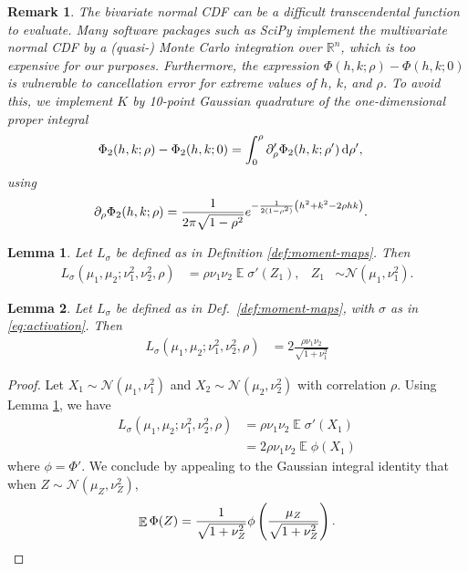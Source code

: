 \documentclass[oneside, article]{memoir}
\newtheorem{remark}{Remark}
\newtheorem{lemma}{Lemma}
\DeclareMathOperator{\expect}{\mathbb{E}}
\begin{document}
\begin{remark}
  The bivariate normal CDF can be a difficult transcendental function
  to evaluate.
  Many software packages such as SciPy \cite{wagner_kalman_2022}
  implement the multivariate normal CDF by a (quasi-) Monte Carlo
  integration over \(\mathbb{R}^n\), which is too expensive for our purposes.
  Furthermore, the expression \(\Phi(h, k; \rho) - \Phi(h, k; 0)\) is
  vulnerable to cancellation error for extreme values of \(h\),
  \(k\), and \(\rho\).
  To avoid this, we implement \(K\) by 10-point Gaussian quadrature
  of the one-dimensional proper integral \cite{drezner_computation_1990}
  \begin{align*}
    \Phi_2(h, k; \rho) -
    \Phi_2(h, k; 0)
    &= \int_0^\rho \partial_\rho' \Phi_2(h, k; \rho') \dif\rho',
  \end{align*}
  using
  \begin{align*}
    \partial_\rho \Phi_2(h, k; \rho)
    &= \frac{1}{2\pi \sqrt{1 - \rho^2}} e^{-\frac{1}{2(1 - \rho^2)}
    \del{h^2 + k^2 - 2 \rho h k}}.
  \end{align*}
\end{remark}

\begin{lemma}
  \label{lem:stein}
  Let \(L_\sigma\) be defined as in Definition \ref{def:moment-maps}.
  Then
  \begin{align*}
    L_\sigma(\mu_1, \mu_2; \nu_1^2, \nu_2^2, \rho) &= \rho
    \nu_1 \nu_2 \expect \sigma'(Z_1),
    & Z_1 &\sim \mathcal N(\mu_1, \nu^2_1).
  \end{align*}
\end{lemma}

\begin{lemma}
  Let \(L_\sigma\) be defined as in Def.~\ref{def:moment-maps}, with
  \(\sigma\) as in \eqref{eq:activation}.
  Then
  \begin{align*}
    L_\sigma(\mu_1, \mu_2; \nu_1^2, \nu_2^2, \rho) &= 2
    \frac{\rho \nu_1 \nu_2}{\sqrt{1 + \nu_1^2}}
  \end{align*}
\end{lemma}
\begin{proof}
  Let \(X_1 \sim \mathcal N(\mu_1, \nu_1^2)\) and \(X_2 \sim
  \mathcal N(\mu_2, \nu_2^2)\) with correlation \(\rho\).
  Using Lemma \ref{lem:stein}, we have
  \begin{align}
    L_\sigma(\mu_1, \mu_2; \nu_1^2, \nu_2^2, \rho)
    &= \rho \nu_1 \nu_2 \expect \sigma'(X_1)
    \\
    &= 2\rho \nu_1 \nu_2 \expect \phi(X_1)
  \end{align}
  where \(\phi = \Phi'\).
  We conclude by appealing to the Gaussian integral identity that
  when \(Z \sim \mathcal N(\mu_Z, \nu_Z^2)\),
  \begin{align}
    \expect \Phi(Z) = \frac{1}{\sqrt{1 + \nu^2_Z}}
    \phi\del{\frac{\mu_Z}{\sqrt{1 + \nu^2_Z}}}.
  \end{align}
\end{proof}
\end{document}
